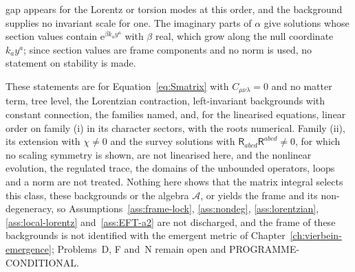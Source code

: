 gap appears for the Lorentz or torsion modes at this order, and the background supplies no invariant scale for one. The imaginary parts of \(\alpha\) give solutions whose section values contain \(\mathrm e^{\beta k_ay^a}\) with \(\beta\) real, which grow along the null coordinate \(k_ay^a\); since section values are frame components and no norm is used, no statement on stability is made.

These statements are for Equation~\eqref{eq:Smatrix} with \(C_{\mu\nu\lambda}=0\) and no matter term, tree level, the Lorentzian contraction, left-invariant backgrounds with constant connection, the families named, and, for the linearised equations, linear order on family (i) in its character sectors, with the roots numerical. Family (ii), its extension with \(\chi\neq0\) and the survey solutions with \(\mathsf R_{abcd}\mathsf R^{abcd}\neq0\), for which no scaling symmetry is shown, are not linearised here, and the nonlinear evolution, the regulated trace, the domains of the unbounded operators, loops and a norm are not treated. Nothing here shows that the matrix integral selects this class, these backgrounds or the algebra \(\mathcal A\), or yields the frame and its non-degeneracy, so Assumptions~\ref{ass:frame-lock}, \ref{ass:nondeg}, \ref{ass:lorentzian}, \ref{ass:local-lorentz} and~\ref{ass:EFT-a2} are not discharged, and the frame of these backgrounds is not identified with the emergent metric of Chapter~\ref{ch:vierbein-emergence}; Problems~D, F and~N remain open and PROGRAMME-CONDITIONAL.
